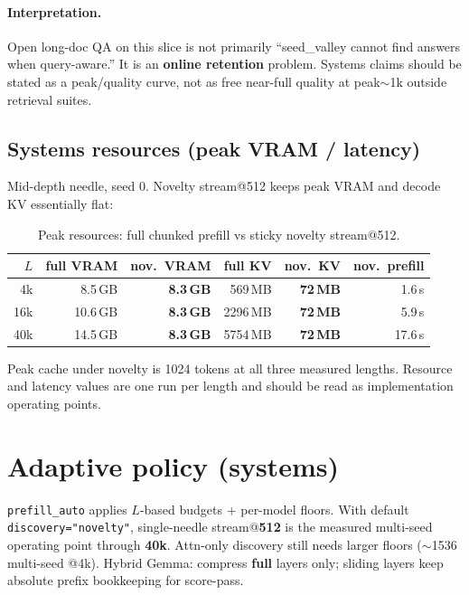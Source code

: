 \documentclass[11pt,a4paper]{article}
\begin{document}
\paragraph{Interpretation.}
Open long-doc QA on this slice is not primarily ``seed\_valley cannot find answers when query-aware.'' It is an \textbf{online retention} problem. Systems claims should be stated as a peak/quality curve, not as free near-full quality at peak$\sim$1k outside retrieval suites.

\subsection{Systems resources (peak VRAM / latency)}

Mid-depth needle, seed 0. Novelty stream@512 keeps peak VRAM and decode KV essentially flat:

\begin{table}[!htbp]
\centering
\caption{Peak resources: full chunked prefill vs sticky novelty stream@512.}
\label{tab:resources}
\small
\begin{tabular}{@{}rrrrrr@{}}
\toprule
$L$ & full VRAM & nov.\ VRAM & full KV & nov.\ KV & nov.\ prefill \\
\midrule
4k & 8.5\,GB & \textbf{8.3\,GB} & 569\,MB & \textbf{72\,MB} & 1.6\,s \\
16k & 10.6\,GB & \textbf{8.3\,GB} & 2296\,MB & \textbf{72\,MB} & 5.9\,s \\
40k & 14.5\,GB & \textbf{8.3\,GB} & 5754\,MB & \textbf{72\,MB} & 17.6\,s \\
\bottomrule
\end{tabular}
\end{table}

Peak cache under novelty is 1024 tokens at all three measured lengths. Resource and latency values are one run per length and should be read as implementation operating points.

\section{Adaptive policy (systems)}

\texttt{prefill\_auto} applies $L$-based budgets + per-model floors. With default \texttt{discovery="novelty"}, single-needle stream@\textbf{512} is the measured multi-seed operating point through \textbf{40k}. Attn-only discovery still needs larger floors ($\sim$1536 multi-seed @4k). Hybrid Gemma: compress \textbf{full} layers only; sliding layers keep absolute prefix bookkeeping for score-pass.
\end{document}
